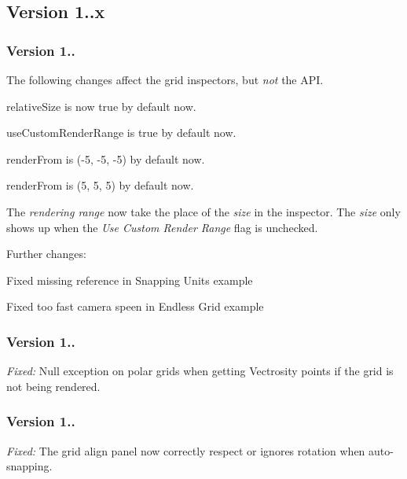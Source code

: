 \subsection*{Version 1..\+x }

\subsubsection*{Version 1..}

The following changes affect the grid inspectors, but {\itshape not} the A\+P\+I.
\begin{DoxyItemize}
\item {\ttfamily relative\+Size} is now {\ttfamily true} by default now.
\item {\ttfamily use\+Custom\+Render\+Range} is {\ttfamily true} by default now.
\item {\ttfamily render\+From} is (-\/5, -\/5, -\/5) by default now.
\item {\ttfamily render\+From} is (5, 5, 5) by default now.
\item The {\itshape rendering range} now take the place of the {\itshape size} in the inspector. The {\itshape size} only shows up when the {\itshape Use Custom Render Range} flag is unchecked.
\end{DoxyItemize}

Further changes\+:
\begin{DoxyItemize}
\item Fixed missing reference in Snapping Units example
\item Fixed too fast camera speen in Endless Grid example
\end{DoxyItemize}

\subsubsection*{Version 1..}


\begin{DoxyItemize}
\item {\itshape Fixed\+:} Null exception on polar grids when getting Vectrosity points if the grid is not being rendered.
\end{DoxyItemize}

\subsubsection*{Version 1..}


\begin{DoxyItemize}
\item {\itshape Fixed\+:} The grid align panel now correctly respect or ignores rotation when auto-\/snapping.
\end{DoxyItemize}

